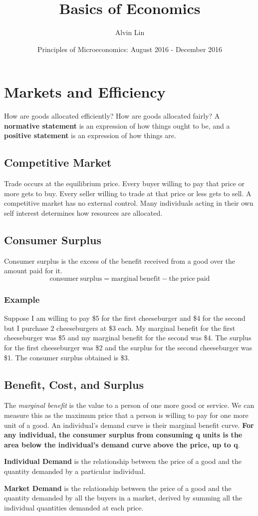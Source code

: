 \documentclass[letterpaper, 12pt]{article}
\title{Basics of Economics}
\author{Alvin Lin}
\date{Principles of Microeconomics: August 2016 - December 2016}
\begin{document}
\maketitle

\section{Markets and Efficiency}
How are goods allocated efficiently? How are goods allocated fairly? A
\textbf{normative statement} is an expression of how things ought to be, and a
\textbf{positive statement} is an expression of how things are.

\subsection{Competitive Market}
Trade occurs at the equilibrium price. Every buyer willing to pay that price
or more gets to buy. Every seller willing to trade at that price or less
gets to sell. A competitive market has no external control. Many individuals
acting in their own self interest determines how resources are allocated.

\subsection{Consumer Surplus}
Consumer surplus is the excess of the benefit received from a good over the
amount paid for it.
\[ \mathrm{consumer\ surplus} = \mathrm{marginal\ benefit}-
   \mathrm{the\ price\ paid} \]

\subsubsection{Example}
Suppose I am willing to pay \$5 for the first cheeseburger and \$4 for the
second but I purchase 2 cheeseburgers at \$3 each. My marginal benefit for the
first cheeseburger was \$5 and my marginal benefit for the second was \$4. The
surplus for the first cheeseburger was \$2 and the surplus for the second
cheeseburger was \$1. The consumer surplus obtained is \$3.

\subsection{Benefit, Cost, and Surplus}
The \textit{marginal benefit} is the value to a person of one more good or
service. We can measure this as the maximum price that a person is willing to
pay for one more unit of a good. An individual's demand curve is their marginal
benefit curve. \textbf{For any individual, the consumer surplus from consuming
q units is the area below the individual's demand curve above the price, up to
q}. \par
\textbf{Individual Demand} is the relationship between the price of a good and
the quantity demanded by a particular individual. \par
\textbf{Market Demand} is the relationship between the price of a good and the
quantity demanded by all the buyers in a market, derived by summing all the
individual quantities demanded at each price.
\end{document}
